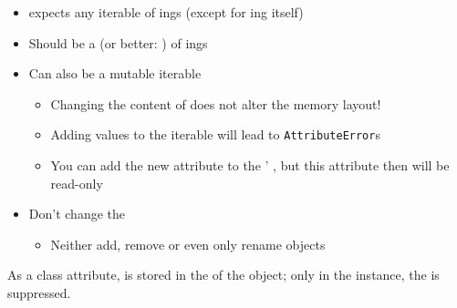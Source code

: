 \begin{frame}
%
\begin{warnbox}
\begin{itemize}
\item {} expects any iterable of ings (except for ing itself)
\item Should be a  (or better: ) of ings
\item Can also be a mutable iterable
	\begin{itemize}
	\item Changing the content of  does not alter the memory layout!
	\item Adding values to the iterable will lead to \texttt{AttributeError}s
	\item You can add the new attribute to the ' , but this attribute then will be read-only
	\end{itemize}
\item[\Thus] Don't change the  
	\begin{itemize}
	\item Neither add, remove or even only rename objects
	\end{itemize}
\end{itemize}
\end{warnbox}
%
\begin{hintbox}
\small
As a class attribute,  is stored in the  of the  object; only in the instance, the  is suppressed.
\end{hintbox}
%
\end{frame}


